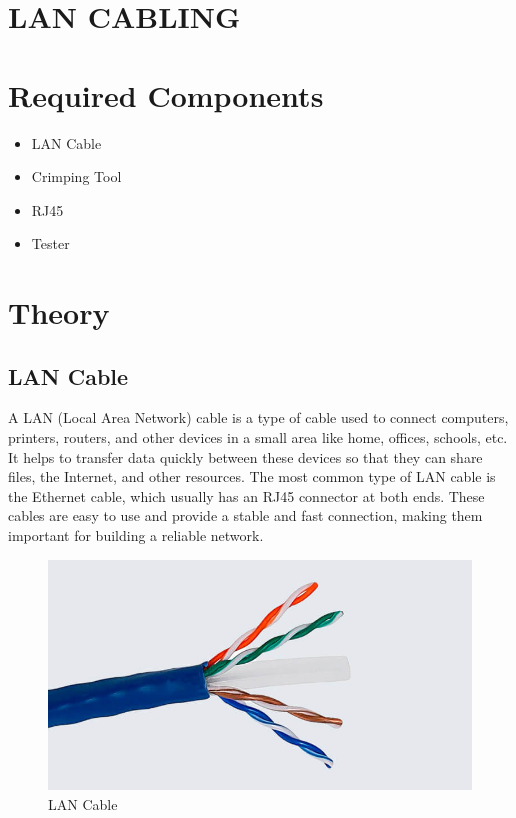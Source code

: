 \documentclass[a4paper,12pt]{report}
\newcommand{\labtopic}{LAN CABLING}
\begin{document}

\newpage
\section*{\centering \Huge{\labtopic}}

\section*{Required Components}
\begin{itemize}
    \item LAN Cable
    \item Crimping Tool
    \item RJ45
    \item Tester
\end{itemize}

\section*{Theory}
\subsection*{LAN Cable}
A LAN (Local Area Network) cable is a type of cable used to connect computers, printers, routers, and other devices in a small area like home, offices, schools, etc. It helps to transfer data quickly between these devices so that they can share files, the Internet, and other resources. The most common type of LAN cable is the Ethernet cable, which usually has an RJ45 connector at both ends. These cables are easy to use and provide a stable and fast connection, making them important for building a reliable network.\\
\begin{figure}[h]
    \centering
    \includegraphics[width=0.9\linewidth]{lan-cable.jpg}
    \caption{LAN Cable}
    \label{fig:lan_cable}
\end{figure}
\end{document}
